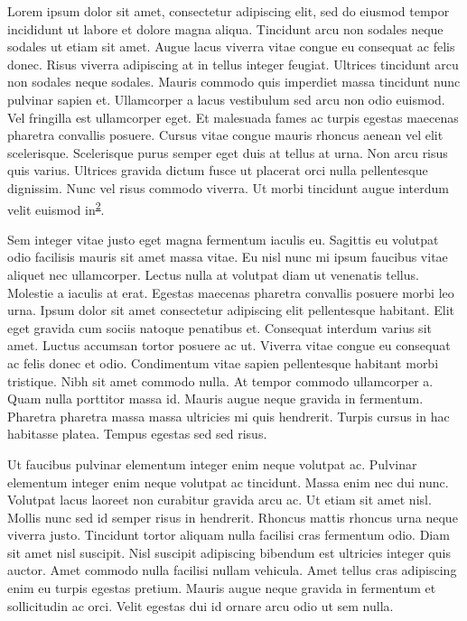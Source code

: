 \documentclass[
]{article}
\begin{document}
Lorem ipsum dolor sit amet, consectetur adipiscing elit, sed do eiusmod tempor incididunt ut labore et dolore magna aliqua. Tincidunt arcu non sodales neque sodales ut etiam sit amet. Augue lacus viverra vitae congue eu consequat ac felis donec. Risus viverra adipiscing at in tellus integer feugiat. Ultrices tincidunt arcu non sodales neque sodales. Mauris commodo quis imperdiet massa tincidunt nunc pulvinar sapien et. Ullamcorper a lacus vestibulum sed arcu non odio euismod. Vel fringilla est ullamcorper eget. Et malesuada fames ac turpis egestas maecenas pharetra convallis posuere. Cursus vitae congue mauris rhoncus aenean vel elit scelerisque. Scelerisque purus semper eget duis at tellus at urna. Non arcu risus quis varius. Ultrices gravida dictum fusce ut placerat orci nulla pellentesque dignissim. Nunc vel risus commodo viverra. Ut morbi tincidunt augue interdum velit euismod in\textsuperscript{\protect\hyperlink{ref-newton1993}{2}}.

Sem integer vitae justo eget magna fermentum iaculis eu. Sagittis eu volutpat odio facilisis mauris sit amet massa vitae. Eu nisl nunc mi ipsum faucibus vitae aliquet nec ullamcorper. Lectus nulla at volutpat diam ut venenatis tellus. Molestie a iaculis at erat. Egestas maecenas pharetra convallis posuere morbi leo urna. Ipsum dolor sit amet consectetur adipiscing elit pellentesque habitant. Elit eget gravida cum sociis natoque penatibus et. Consequat interdum varius sit amet. Luctus accumsan tortor posuere ac ut. Viverra vitae congue eu consequat ac felis donec et odio. Condimentum vitae sapien pellentesque habitant morbi tristique. Nibh sit amet commodo nulla. At tempor commodo ullamcorper a. Quam nulla porttitor massa id. Mauris augue neque gravida in fermentum. Pharetra pharetra massa massa ultricies mi quis hendrerit. Turpis cursus in hac habitasse platea. Tempus egestas sed sed risus.

Ut faucibus pulvinar elementum integer enim neque volutpat ac. Pulvinar elementum integer enim neque volutpat ac tincidunt. Massa enim nec dui nunc. Volutpat lacus laoreet non curabitur gravida arcu ac. Ut etiam sit amet nisl. Mollis nunc sed id semper risus in hendrerit. Rhoncus mattis rhoncus urna neque viverra justo. Tincidunt tortor aliquam nulla facilisi cras fermentum odio. Diam sit amet nisl suscipit. Nisl suscipit adipiscing bibendum est ultricies integer quis auctor. Amet commodo nulla facilisi nullam vehicula. Amet tellus cras adipiscing enim eu turpis egestas pretium. Mauris augue neque gravida in fermentum et sollicitudin ac orci. Velit egestas dui id ornare arcu odio ut sem nulla.
\end{document}
